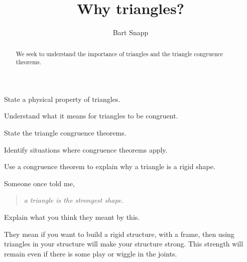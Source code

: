 \documentclass[noauthor,nooutcomes,handout,12pt]{ximera}
\title{Why triangles?}
\author{Bart Snapp}
\begin{document}
\begin{abstract}
  We seek to understand the importance of triangles and the triangle
  congruence theorems.
\end{abstract}
\maketitle


\begin{listOutcomes}
\item{State a physical property of triangles.}
\item{Understand what it means for triangles to be congruent.}
\item{State the triangle congruence theorems.}
\item{Identify situations where congruence theorems apply.}
\item{Use a congruence theorem to explain why a triangle is a rigid shape.}
\end{listOutcomes}

\mynewpage


\begin{question}
  Someone once told me,
  \begin{quote}
    \textit{a triangle is the strongest shape.}
  \end{quote}
  Explain what you think they meant by this.
  \begin{freeResponse}
    They mean if you want to build a rigid structure, with a frame,
    then using triangles in your structure will make your structure
    strong. This strength will remain even if there is some play
    or wiggle in the joints.
  \end{freeResponse}
\end{question}
\mynewpage
\end{document}
